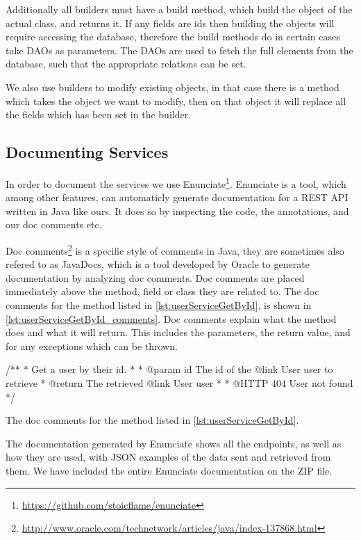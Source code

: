 Additionally all builders must have a build method, which build the object of the actual class, and returns it.
If any fields are ids then building the objects will require accessing the database,
therefore the build methods do in certain cases take \acp{DAO} as parameters.
The \acp{DAO} are used to fetch the full elements from the database,
such that the appropriate relations can be set.

We also use builders to modify existing objects,
in that case there is a method which takes the object we want to modify,
then on that object it will replace all the fields which has been set in the builder.

\subsection{Documenting Services}
In order to document the services we use Enunciate\footnote{\url{https://github.com/stoicflame/enunciate}}.
Enunciate is a tool, which among other features, can automaticly generate documentation for a REST API written in Java like ours.
It does so by inspecting the code, the annotations, and our doc comments etc.

Doc comments\footnote{\url{http://www.oracle.com/technetwork/articles/java/index-137868.html}} is a specific style of comments in Java, they are sometimes also refered to as JavaDocs, which is a tool developed by Oracle to generate documentation by analyzing doc comments.
Doc comments are placed immediately above the method, field or class they are related to.
The doc comments for the method listed in \cref{lst:userServiceGetById}, is shown in \cref{lst:userServiceGetById_comments}.
Doc comments explain what the method does and what it will return.
This includes the parameters, the return value, and for any exceptions which can be thrown.

\begin{listing}
    \begin{java2}
/**
 * Get a user by their id.
 *
 * @param id The id of the {@link User user} to retrieve
 * @return The retrieved {@link User user}
 *
 * @HTTP 404 User not found
 */
    \end{java2}
    \caption{The doc comments for the method listed in \cref{lst:userServiceGetById}.}\label{lst:userServiceGetById_comments}
\end{listing}

The documentation generated by Enunciate shows all the endpoints, as well as how they are used,
with JSON examples of the data sent and retrieved from them.
We have included the entire Enunciate documentation on the ZIP file.


